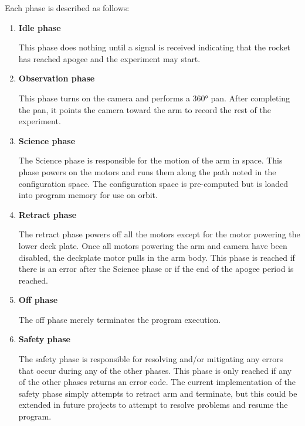 Each phase is described as follows:
\begin{enumerate}
	\item{\textbf{Idle phase}}

	This phase does nothing until a signal is received indicating that the
	rocket has reached apogee and the experiment may start.

	\item{\textbf{Observation phase}}

	This phase turns on the camera and performs a 360° pan.
	After completing the pan, it points the camera toward the arm to record the
	rest of the experiment.

	\item{\textbf{Science phase}}

	The Science phase is responsible for the motion of the arm in space.
	This phase powers on the motors and runs them along the path noted in the configuration 
	space. The configuration space is pre-computed but is loaded into program memory for use on 
	orbit.

	\item{\textbf{Retract phase}}

	The retract phase powers off all the motors except for the motor powering the lower deck plate. Once all motors powering the arm
	and camera have been disabled, the deckplate motor pulls in the arm body. This phase is reached if there is an error after the 
	Science phase or if the end of the apogee period is reached.

	\item{\textbf{Off phase}}

	The off phase merely terminates the program execution.

	\item{\textbf{Safety phase}}

	The safety phase is responsible for resolving and/or mitigating any errors
	that occur during any of the other phases.
	This phase is only reached if any of the other phases returns an error
	code.
	The current implementation of the safety phase simply attempts to retract
	arm and terminate, but this could be extended in future projects to attempt to resolve
	problems and resume the program.
\end{enumerate}

